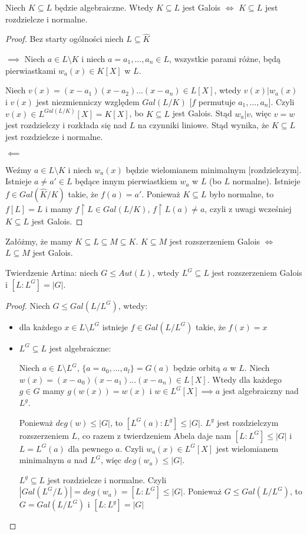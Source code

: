 \begin{theorem}
Niech $K\subseteq L$ będzie algebraiczne. Wtedy $K\subseteq L$ jest Galois $\iff$ $K\subseteq L$ jest rozdzielcze i normalne.
\end{theorem}
\begin{proof}
Bez starty ogólności niech $L\subseteq\hat{K}$

$\implies$ Niech $a\in L\setminus K$ i niech $a=a_1,...,a_n\in L$, wszystkie parami różne, będą pierwiastkami $w_a(x)\in K[X]$ w $L$.

Niech $v(x)=(x-a_1)(x-a_2)...(x-a_n)\in L[X]$, wtedy $v(x)|w_a(x)$ i $v(x)$ jest niezmienniczy względem $Gal(L/K)$ [$f$ permutuje $a_1,...,a_n$]. Czyli $v(x)\in L^{Gal(L/K)}[X]=K[X]$, bo $K\subseteq L$ jest Galois. Stąd $w_a|v$, więc $v=w$ jest rozdzielczy i rozkłada się nad $L$ na czynniki liniowe. Stąd wynika, że $K\subseteq L$ jest rozdzielcze i normalne.

$\impliedby$

Weźmy $a\in L\setminus K$ i niech $w_a(x)$ będzie wielomianem minimalnym [rozdzielczym]. Istnieje $a\neq a'\in L$ będące innym pierwiastkiem $w_a$ w $L$ (bo $L$ normalne). Istnieje $f\in Gal(\hat{K}/K)$ takie, że $f(a)=a'$. Ponieważ $K\subseteq L$ było normalne, to $f[L]=L$ i mamy $f\restriction L\in Gal(L/K)$, $f\restriction L(a)\neq a$, czyli z uwagi wcześniej $K\subseteq L$ jest Galois.
\end{proof}

\begin{conclusion}
Załóżmy, że mamy $K\subseteq L\subseteq M\subseteq K$. $K\subseteq M$ jest rozszerzeniem Galois $\iff$ $L\subseteq M$ jest Galois.
\end{conclusion}

\begin{theorem}[Artin]
Twierdzenie Artina: niech $G\leq Aut(L)$, wtedy $L^G\subseteq L$ jest rozszerzeniem Galois i $[L:L^G]=|G|$.
\end{theorem}
\begin{proof}
Niech $G\leq Gal(L/L^G)$, wtedy:
\begin{itemize}
    \item dla każdego $x\in L\setminus L^G$ istnieje $f\in Gal(L/L^G)$ takie, że $f(x)=x$
    \item $L^G\subseteq L$ jest algebraiczne:

    Niech $a\in L\setminus L^G$, $\{a=a_0,...,a_l\}=G(a)$ będzie orbitą $a$ w $L$. Niech $w(x)=(x-a_0)(x-a_1)...(x-a_n)\in L[X]$. Wtedy dla każdego $g\in G$ mamy $g(w(x))=w(x)$ i $w\in L^G[X]\implies a$ jest algebraiczny nad $L^g$.

    Ponieważ $deg(w)\leq |G|$, to $[L^G(a):L^g]\leq |G|$. $L^g$ jest rozdzielczym rozszerzeniem $L$, co razem z twierdzeniem Abela daje nam $[L:L^G]\leq |G|$ i $L=L^G(a)$ dla pewnego $a$. Czyli $w_a(x)\in L^G[X]$ jest wielomianem minimalnym $a$ nad $L^G$, więc $deg(w_a)\leq|G|$. 

    $L^g\subseteq L$ jest rozdzielcze i normalne. Czyli $|Gal(L^G/L)|=deg(w_a)=[L:L^G]\leq|G|$. Ponieważ $G\leq Gal(L/L^G)$, to $G=Gal(L/L^G)$ i $[L:L^g]=|G|$
\end{itemize}
\end{proof}

